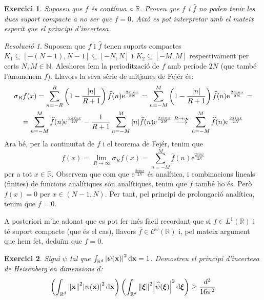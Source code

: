 \documentclass[10pt,a4paper]{article}
\newcommand{\NN}{\ensuremath{\mathbb{N}}} %
\newcommand{\RR}{\ensuremath{\mathbb{R}}} %
\newcommand{\vf}[1]{\boldsymbol{\mathrm{#1}}} %
\newcommand{\ii}{\mathrm{i}} %
\newtheorem{exercici}{Exercici}
\theoremstyle{definition}
\theoremstyle{remark}
\newtheorem*{res}{Resolució}
\renewcommand{\exp}[1]{\mathrm{e}^{#1}} %
\begin{document}
\begin{exercici}
  Suposeu que $f$ és contínua a $\RR$. Proveu que $f$ i $\widehat{f}$ no poden tenir les dues suport compacte a no ser que $f = 0$. Això es pot interpretar amb el mateix esperit que el principi d'incertesa.
\end{exercici}
\begin{res}
  Suposem que $f$ i $\widehat{f}$ tenen suports compactes $K_1\subseteq [-(N-1),N-1]\subseteq [-N,N]$ i $K_2\subseteq [-M,M]$ respectivament per certs $N,M\in\NN$. Aleshores fem la periodització de $f$ amb període $2N$ (que també l'anomenem $f$). Llavors la seva sèrie de mitjanes de Fejér és:
  \begin{multline*}
    \sigma_Rf(x)=\sum_{n=-R}^{R}\left(1-\frac{\abs{n}}{R+1}\right)\widehat{f}(n)\exp{\frac{2\pi\ii n x}{2N}}=\sum_{n=-M}^{M}\left(1-\frac{\abs{n}}{R+1}\right)\widehat{f}(n)\exp{\frac{2\pi\ii n x}{2N}}=\\
    =\sum_{n=-M}^{M}\widehat{f}(n)\exp{\frac{2\pi\ii n x}{2N}}-\frac{1}{R+1}\sum_{n=-M}^{M}\abs{n}\widehat{f}(n)\exp{\frac{2\pi\ii n x}{2N}}\overset{R\to\infty}{\longrightarrow} \sum_{n=-M}^{M}\widehat{f}(n)\exp{\frac{2\pi\ii n x}{2N}}
  \end{multline*}
  Ara bé, per la continuïtat de $f$ i el teorema de Fejér, tenim que
  $$f(x)=\lim_{R\to\infty}\sigma_Rf(x)=\sum_{n=-M}^{M}\widehat{f}(n)\exp{\frac{2\pi\ii n x}{2N}}$$
  per a tot $x\in\RR$.
  Observem que com que $\exp{\frac{2\pi\ii n x}{2N}}$ és analítica, i combinacions lineals (finites) de funcions analítiques són analítiques, tenim que $f$ també ho és. Però $f(x)=0$ per $x\in(N-1,N)$. Per tant, pel principi de prolongació analítica, tenim que $f=0$.

  A posteriori m'he adonat que es pot fer més fàcil recordant que si $f\in L^1(\RR)$ i té suport compacte (que és el cas), llavors $\widehat{f}\in\mathcal{C}^\omega(\RR)$ i, pel mateix argument que hem fet, deduïm que $f=0$.
\end{res}
\begin{exercici}
  Sigui $\psi$ tal que $\int_{\RR^d}\abs{\psi(\vf{x})}^2\dd{\vf{x}}=1$. Demostreu el principi d'incertesa de Heisenberg en dimensions $d$:
  $$\left(\int_{\RR^d} \norm{\vf{x}}^2 \abs{\psi(\vf{x})}^2\dd{\vf{x}}\right)\left(\int_{\RR^d} \norm{\vf\xi}^2 \abs{\widehat{\psi}(\vf\xi)}^2\dd{\vf\xi}\right)\geq \frac{d^2}{16\pi^2}$$
\end{exercici}
\end{document}
